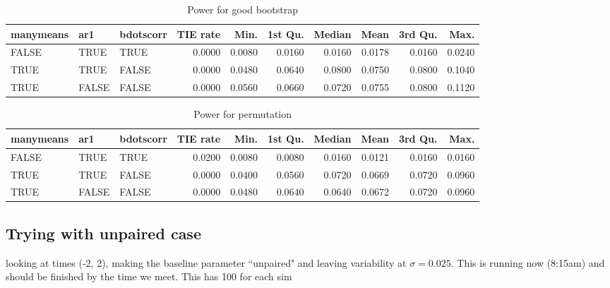 \documentclass{article}
\begin{document}
\begin{table}[ht]
\centering
\begin{tabular}{lllrrrrrrr}
  \hline
manymeans & ar1 & bdotscorr & TIE rate & Min. & 1st Qu. & Median & Mean & 3rd Qu. & Max. \\ 
  \hline
FALSE & TRUE & TRUE & 0.0000 & 0.0080 & 0.0160 & 0.0160 & 0.0178 & 0.0160 & 0.0240 \\ 
  TRUE & TRUE & FALSE & 0.0000 & 0.0480 & 0.0640 & 0.0800 & 0.0750 & 0.0800 & 0.1040 \\ 
  TRUE & FALSE & FALSE & 0.0000 & 0.0560 & 0.0660 & 0.0720 & 0.0755 & 0.0800 & 0.1120 \\ 
   \hline
\end{tabular}
\caption{Power for good bootstrap} 
\label{tab:good_boot_pwr2}
\end{table}

\begin{table}[ht]
\centering
\begin{tabular}{lllrrrrrrr}
  \hline
manymeans & ar1 & bdotscorr & TIE rate & Min. & 1st Qu. & Median & Mean & 3rd Qu. & Max. \\ 
  \hline
FALSE & TRUE & TRUE & 0.0200 & 0.0080 & 0.0080 & 0.0160 & 0.0121 & 0.0160 & 0.0160 \\ 
  TRUE & TRUE & FALSE & 0.0000 & 0.0400 & 0.0560 & 0.0720 & 0.0669 & 0.0720 & 0.0960 \\ 
  TRUE & FALSE & FALSE & 0.0000 & 0.0480 & 0.0640 & 0.0640 & 0.0672 & 0.0720 & 0.0960 \\ 
   \hline
\end{tabular}
\caption{Power for permutation} 
\label{tab:perm_pwr2}
\end{table}

\subsection{Trying with unpaired case}

looking at times (-2, 2), making the baseline parameter ``unpaired" and leaving  variability at $\sigma = 0.025$. This is running now (8:15am) and should be finished by the time we meet. This has 100 for each sim
\end{document}

